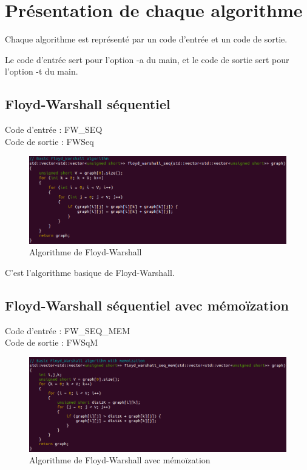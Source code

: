 \documentclass[a4paper,11pt]{article}
\begin{document}
\section{Présentation de chaque algorithme}

Chaque algorithme est représenté par un code d'entrée et un code de sortie.

Le code d'entrée sert pour l'option -a du main, et le code de sortie sert pour l'option -t du main.

\subsection{Floyd-Warshall séquentiel}

\noindent Code d'entrée : FW\_SEQ \\
Code de sortie : FWSeq

\begin{figure}[H]
\begin{center}
  \includegraphics[scale=0.7]{FW_SEQ.png}
  \caption{Algorithme de Floyd-Warshall}
\end{center}
\end{figure}

C'est l'algorithme basique de Floyd-Warshall.

\subsection{Floyd-Warshall séquentiel avec mémoïzation}

\noindent Code d'entrée : FW\_SEQ\_MEM \\
Code de sortie : FWSqM

\begin{figure}[H]
\begin{center}
  \includegraphics[scale=0.6]{FW_SEQ_MEM.png}
  \caption{Algorithme de Floyd-Warshall avec mémoïzation}
\end{center}
\end{figure}
\end{document}
